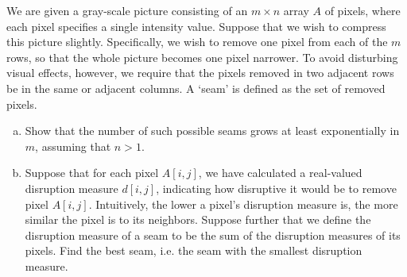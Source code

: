 \problem{}
We are given a gray-scale picture consisting of an $m \times n$ array $A$ of pixels, where each pixel specifies a single intensity value. Suppose that we wish to compress this picture slightly. Specifically, we wish to remove one pixel from each of the $m$ rows, so that the whole picture becomes one pixel narrower. To avoid disturbing visual effects, however, we require that the pixels removed in two adjacent rows be in the same or adjacent columns. A `seam' is defined as the set of removed pixels.
\begin{enumerate}[(a)]
\item Show that the number of such possible seams grows at least exponentially in $m$, assuming that $n > 1$.
\item Suppose that for each pixel $A[i, j]$, we have calculated a real-valued disruption measure $d[i, j]$, indicating how disruptive it would be to remove pixel $A[i, j]$. Intuitively, the lower a pixel's disruption measure is, the more similar the pixel is to its neighbors. Suppose further that we define the disruption measure of a seam to be the sum of the disruption measures of its pixels. Find the best seam, i.e. the seam with the smallest disruption measure.
\end{enumerate}

\solution{

}

\newpage